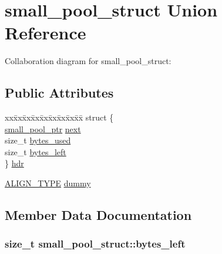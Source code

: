 \hypertarget{unionsmall__pool__struct}{}\section{small\+\_\+pool\+\_\+struct Union Reference}
\label{unionsmall__pool__struct}


Collaboration diagram for small\+\_\+pool\+\_\+struct\+:
\subsection*{Public Attributes}
\begin{DoxyCompactItemize}
\item 
\begin{tabbing}
xx\=xx\=xx\=xx\=xx\=xx\=xx\=xx\=xx\=\kill
struct \{\\
\>\hyperlink{jmemmgr_8c_a589d78516510f4b5a5d44e28debeab4d}{small\_pool\_ptr} \hyperlink{unionsmall__pool__struct_a35adccff412d109347d363744d0bcd19}{next}\\
\>size\_t \hyperlink{unionsmall__pool__struct_abe8273ffbd9403c060714752d28ef95f}{bytes\_used}\\
\>size\_t \hyperlink{unionsmall__pool__struct_aa664b607d7abb157024ea55a4bf12b8f}{bytes\_left}\\
\} \hyperlink{unionsmall__pool__struct_aa49a2258b7552bf5ec0302434d862fbf}{hdr}\\

\end{tabbing}\item 
\hyperlink{jmemmgr_8c_a4781c052bb138f69ef6d60737fd569e3}{A\+L\+I\+G\+N\+\_\+\+T\+Y\+P\+E} \hyperlink{unionsmall__pool__struct_a73cdd7a86eb8b88c7e4e9ff91aee3f99}{dummy}
\end{DoxyCompactItemize}


\subsection{Member Data Documentation}
\hypertarget{unionsmall__pool__struct_aa664b607d7abb157024ea55a4bf12b8f}{}
\subsubsection[{bytes\+\_\+left}]{\setlength{\rightskip}{0pt plus 5cm}size\+\_\+t small\+\_\+pool\+\_\+struct\+::bytes\+\_\+left}\label{unionsmall__pool__struct_aa664b607d7abb157024ea55a4bf12b8f}
\hypertarget{unionsmall__pool__struct_abe8273ffbd9403c060714752d28ef95f}{}
